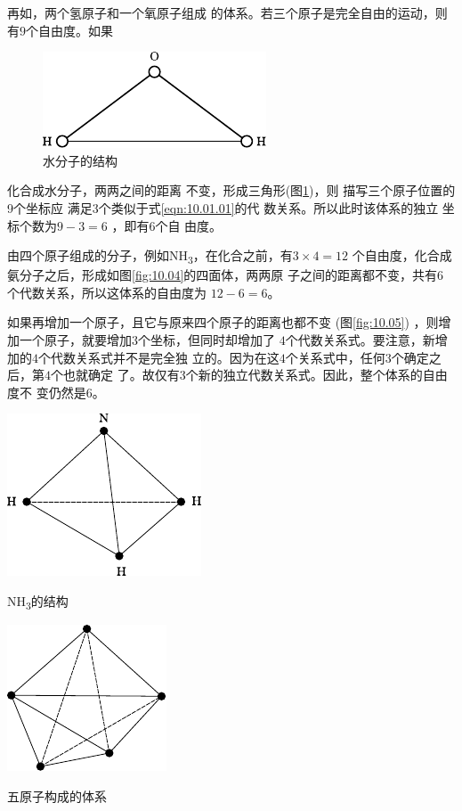 再如，两个氢原子和一个氧原子组成
的体系。若三个原子是完全自由的运动，则有$ 9 $个自由度。如果

\begin{figure}
    \centering
    \includegraphics{figure/fig10.03}
    \caption{水分子的结构}
    \label{fig:10.03}
\end{figure}
\noindent
化合成水分子，两两之间的距离
不变，形成三角形(图\ref{fig:10.03})，则
描写三个原子位置的9个坐标应
满足$ 3 $个类似于式\eqref{eqn:10.01.01}的代
数关系。所以此时该体系的独立
坐标个数为$  9 - 3 = 6  $ ，即有$ 6 $个自
由度。

由四个原子组成的分子，例如NH\textsubscript{3}，在化合之前，有$  3 \times 4 = 1 2  $
个自由度，化合成氨分子之后，形成如图\ref{fig:10.04}的四面体，两两原
子之间的距离都不变，共有$ 6 $个代数关系，所以这体系的自由度为
$ 1 2 - 6 = 6  $。

如果再增加一个原子，且它与原来四个原子的距离也都不变
(图\ref{fig:10.05})  ，则增加一个原子，就要增加$ 3 $个坐标，但同时却增加了
$ 4 $个代数关系式。要注意，新增加的$ 4 $个代数关系式并不是完全独
立的。因为在这$ 4 $个关系式中，任何$ 3 $个确定之后，第$ 4 $个也就确定
了。故仅有$ 3 $个新的独立代数关系式。因此，整个体系的自由度不
变仍然是$ 6 $。

\clearpage
\begin{figurex}
    \begin{minipage}[b]{0.5\linewidth}
        \centering
        \includegraphics{figure/fig10.04}
        \caption{NH\textsubscript{3}的结构}
        \label{fig:10.04}
    \end{minipage}
    \begin{minipage}[b]{0.5\linewidth}
        \centering
        \includegraphics{figure/fig10.05}
        \caption{五原子构成的体系}
        \label{fig:10.05}
    \end{minipage}
\end{figurex}


